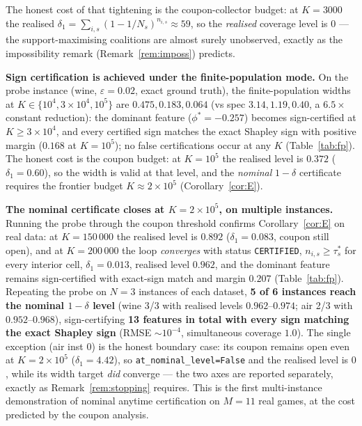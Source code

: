 \documentclass[11pt,twocolumn]{article}
\begin{document}
The honest cost of that tightening is the coupon-collector budget: at
$K=3000$ the realised $\delta_1=\sum_{i,s}(1-1/N_s)^{n_{i,s}}\approx59$,
so the \emph{realised} coverage level is $0$ — the support-maximising
coalitions are almost surely unobserved, exactly as the impossibility
remark (Remark~\ref{rem:imposs}) predicts.

\textbf{Sign certification is achieved under the finite-population mode.}
On the probe instance (wine, $\varepsilon=0.02$, exact ground truth), the
finite-population widths at $K\in\{10^4,3\times10^4,10^5\}$ are
$0.475,0.183,0.064$ (vs spec $3.14,1.19,0.40$, a $6.5\times$ constant
reduction): the dominant feature ($\phi^*=-0.257$) becomes sign-certified
at $K\ge3\times10^4$, and every certified sign matches the exact Shapley
sign with positive margin ($0.168$ at $K=10^5$); no false certifications
occur at any $K$ (Table~\ref{tab:fp}).  The honest cost is the coupon
budget: at $K=10^5$ the realised level is $0.372$ ($\delta_1=0.60$), so the
width is valid at that level, and the \emph{nominal} $1-\delta$
certificate requires the frontier budget $K\approx2\times10^5$
(Corollary~\ref{cor:E}).

\textbf{The nominal certificate closes at $K=2\times10^5$, on multiple
instances.}  Running the probe through the coupon threshold confirms
Corollary~\ref{cor:E} on real data: at $K=150\,000$ the realised level is
$0.892$ ($\delta_1=0.083$, coupon still open), and at $K=200\,000$ the
loop \emph{converges} with status \texttt{CERTIFIED},
$n_{i,s}\ge\tau_s^*$ for every interior cell, $\delta_1=0.013$, realised
level $0.962$, and the dominant feature remains sign-certified with
exact-sign match and margin $0.207$ (Table~\ref{tab:fp}).  Repeating the
probe on $N{=}3$ instances of each dataset, \textbf{5 of 6 instances
reach the nominal $1-\delta$ level} (wine 3/3 with realised levels
$0.962$--$0.974$; air 2/3 with $0.952$--$0.968$), sign-certifying
\textbf{13 features in total with every sign matching the exact Shapley
sign} (RMSE $\sim10^{-4}$, simultaneous coverage $1.0$).  The single
exception (air inst 0) is the honest boundary case: its coupon remains
open even at $K{=}2\times10^5$ ($\delta_1{=}4.42$), so
\texttt{at\_nominal\_level=False} and the realised level is $0$, while
its width target \emph{did} converge --- the two axes are reported
separately, exactly as Remark~\ref{rem:stopping} requires.  This is the
first multi-instance demonstration of nominal anytime certification on
$M{=}11$ real games, at the cost predicted by the coupon analysis.
\end{document}
